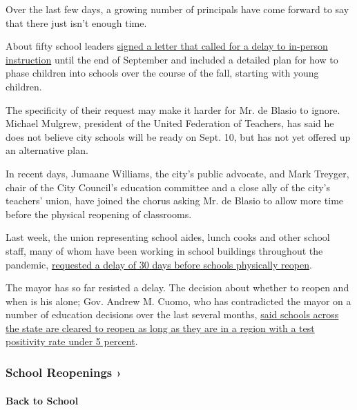 Over the last few days, a growing number of principals have come forward
to say that there just isn't enough time.

About fifty school leaders
\href{https://docs.google.com/document/d/1s6RLidO59mPKy_Qxqrr2Vp771y0f41LzNuMSgLK-CI8/edit}{signed
a letter that called for a delay to in-person instruction} until the end
of September and included a detailed plan for how to phase children into
schools over the course of the fall, starting with young children.

The specificity of their request may make it harder for Mr. de Blasio to
ignore. Michael Mulgrew, president of the United Federation of Teachers,
has said he does not believe city schools will be ready on Sept. 10, but
has not yet offered up an alternative plan.

In recent days, Jumaane Williams, the city's public advocate, and Mark
Treyger, chair of the City Council's education committee and a close
ally of the city's teachers' union, have joined the chorus asking Mr. de
Blasio to allow more time before the physical reopening of classrooms.

Last week, the union representing school aides, lunch cooks and other
school staff, many of whom have been working in school buildings
throughout the pandemic,
\href{https://gothamist.com/news/lunch-workers-union-school-aides-urge-de-blasio-delay-nyc-school-reopening}{requested
a delay of 30 days before schools physically reopen}.

The mayor has so far resisted a delay. The decision about whether to
reopen and when is his alone; Gov. Andrew M. Cuomo, who has contradicted
the mayor on a number of education decisions over the last several
months,
\href{https://www.nytimes3xbfgragh.onion/2020/08/07/nyregion/cuomo-schools-reopening.html}{said
schools across the state are cleared to reopen as long as they are in a
region with a test positivity rate under 5 percent}.

\href{https://www.nytimes3xbfgragh.onion/spotlight/schools-reopening?action=click\&pgtype=Article\&state=default\&region=MAIN_CONTENT_3\&context=storylines_keepup}{}

\hypertarget{school-reopenings-}{%
\subsubsection{School Reopenings ›}\label{school-reopenings-}}

\hypertarget{back-to-school}{%
\paragraph{Back to School}\label{back-to-school}}

